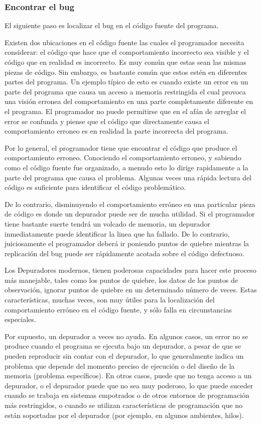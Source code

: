 \documentclass[12pt,a4paper]{report}
\begin{document}
\subsubsection{Encontrar el bug}

El siguiente paso es localizar el bug en el código fuente del programa.

Existen dos ubicaciones en el código fuente las cuales el programador necesita considerar: el código que hace que el comportamiento incorrecto sea visible y el código que en realidad es incorrecto.  Es muy común que estas sean las mismas piezas de código.  Sin embargo, es bastante común que estos estén en diferentes partes del programa.  Un ejemplo típico de esto es cuando existe un error en un parte del programa que causa un acceso a memoria restringida el cual provoca una visión erronea del comportamiento en una parte completamente diferente en el programa.  El programador no puede permitirse que en el afán de arreglar el error se confunda y piense que el código que directamente causa el comportamiento erroneo es en realidad la parte incorrecta del programa.

Por lo general, el programador tiene que encontrar el código que produce el comportamiento erroneo.  Conociendo el comportamiento erroneo, y sabiendo como el código fuente fue organizado, a menudo esto lo dirige rapidamente a la parte del programa que causa el problema.  Algunas veces una rápida lectura del código es suficiente para identificar el código problemático.

De lo contrario, disminuyendo el comportamiento erróneo en una particular pieza de código es donde un depurador puede ser de mucha utilidad.  Si el programador tiene bastante suerte tendrá un volcado de memoria, un depurador inmediatamente puede identificar la linea que ha fallado.  De lo contrario, juiciosamente el programador deberá ir poniendo puntos de quiebre mientras la replicación del bug puede ser rápidamente acotada sobre el código defectuoso.

Los Depuradores modernos, tienen poderosas capacidades para hacer este proceso más manejable, tales como los puntos de quiebre, los datos de los puntos de observación, ignorar puntos de quiebre en un determinado número de veces.  Estas características, muchas veces, son muy útiles para la localización del comportamiento erróneo en el código fuente, y sólo falla en circunstancias especiales.

Por supuesto, un depurador a veces no ayuda. En algunos casos, un error no se produce cuando el programa se ejecuta bajo un depurador, a pesar de que se pueden reproducir sin contar con el depurador, lo que generalmente indica un problema que depende del momento preciso de ejecución o del diseño de la memoria (problema específicos). En otros casos, puede que no tenga acceso a un depurador, o el depurador puede que no sea muy poderoso, lo que puede suceder cuando se trabaja en sistemas empotrados o de otros entornos de programación más restringidos, o cuando se utilizan características de programación que no están soportadas por el depurador (por ejemplo, en algunos ambientes, hilos).
\end{document}
